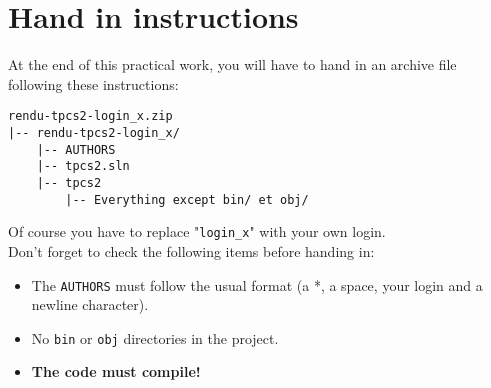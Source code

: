 \section{Hand in instructions}

At the end of this practical work, you will have to hand in an archive file following these instructions:\\

\begin{lstlisting}
rendu-tpcs2-login_x.zip
|-- rendu-tpcs2-login_x/
    |-- AUTHORS
    |-- tpcs2.sln
    |-- tpcs2
        |-- Everything except bin/ et obj/
\end{lstlisting}
\bigskip

Of course you have to replace "\texttt{login\_x}" with your own
login.\\

Don't forget to check the following items before handing in:\\

\begin{itemize}
  \item The \texttt{AUTHORS} must follow the usual format (a *, a
  space, your login and a newline character).
  \item No \texttt{bin} or \texttt{obj} directories in the project.
  \item \textbf{The code must compile!}
\end{itemize}
\bigskip
